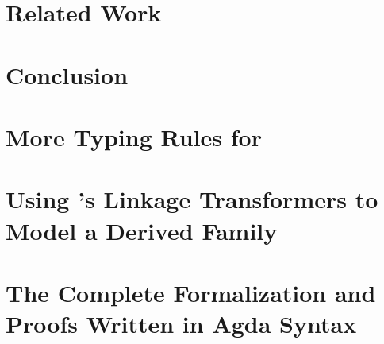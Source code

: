 \section{Related Work}\label{sec:related-work}


\section{Conclusion}
\label{sec:conclusion}



\setlength{\bibsep}{.8ex}



\ifreport

\appendix

\newpage

\section{More Typing Rules for \TT}


\newpage

\section{Using \TT's Linkage Transformers to Model a Derived Family}


\newpage

\section{The Complete Formalization and Proofs Written in Agda Syntax}
\label{sec:agda-files}


%
%
%

\fi